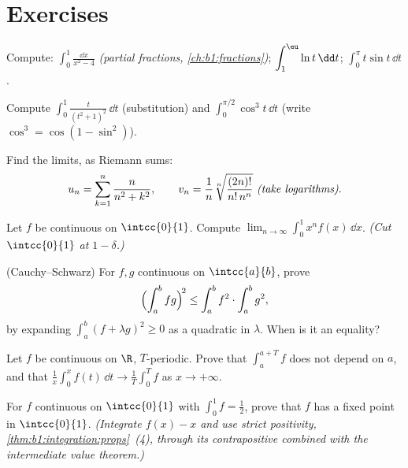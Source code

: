 \section{Exercises}

\begin{exercise}[$\star$]\label{exo:b1:integration:1}
Compute: $\displaystyle\int_0^1 \frac{\dd x}{x^2 - 4}$
\emph{(partial fractions, \cref{ch:b1:fractions})};
$\displaystyle\int_1^{\eu} \ln t \,\dd t$;
$\displaystyle\int_0^{\pi} t \sin t\, \dd t$.
\end{exercise}

\begin{exercise}[$\star$]\label{exo:b1:integration:2}
Compute $\displaystyle\int_0^{1} \frac{t}{(t^2+1)^2}\,\dd t$
(substitution) and
$\displaystyle\int_0^{\pi/2} \cos^3 t\, \dd t$ (write $\cos^3 =
\cos(1 - \sin^2)$).
\end{exercise}

\begin{exercise}[$\star$]\label{exo:b1:integration:3}
Find the limits, as Riemann sums:
\[
u_n = \sum_{k=1}^{n} \frac{n}{n^2 + k^2},
\qquad
v_n = \frac{1}{n}\sqrt[n]{\frac{(2n)!}{n!\,n^n}}
\ \emph{(take logarithms)}.
\]
\end{exercise}

\begin{exercise}[$\star$]\label{exo:b1:integration:4}
Let $f$ be continuous on $\intcc{0}{1}$. Compute $\lim_{n\to\infty}
\int_0^1 x^n f(x)\,\dd x$. \emph{(Cut $\intcc{0}{1}$ at $1 -
\delta$.)}
\end{exercise}

\begin{exercise}[$\star\star$]\label{exo:b1:integration:5}
(Cauchy--Schwarz) For $f, g$ continuous on $\intcc{a}{b}$, prove
\[
\Bigl(\int_a^b fg\Bigr)^{\!2} \leq \int_a^b f^2 \cdot \int_a^b g^2 ,
\]
by expanding $\int_a^b (f + \lambda g)^2 \geq 0$ as a quadratic in
$\lambda$. When is it an equality?
\end{exercise}

\begin{exercise}[$\star\star$]\label{exo:b1:integration:6}
Let $f$ be continuous on $\R$, $T$-periodic. Prove that $\int_a^{a+T}
f$ does not depend on $a$, and that $\frac1x \int_0^x f(t)\,\dd t
\to \frac 1T \int_0^T f$ as $x \to +\infty$.
\end{exercise}

\begin{exercise}[$\star\star$]\label{exo:b1:integration:7}
For $f$ continuous on $\intcc{0}{1}$ with $\int_0^1 f = \frac12$,
prove that $f$ has a fixed point in $\intcc{0}{1}$. \emph{(Integrate
$f(x) - x$ and use strict positivity,
\cref{thm:b1:integration:props}~(4), through its contrapositive
combined with the intermediate value theorem.)}
\end{exercise}

